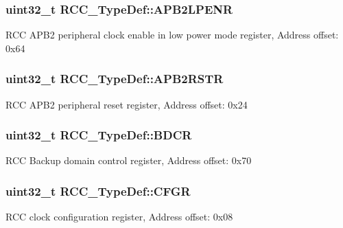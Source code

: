 \subsubsection[{\texorpdfstring{A\+P\+B2\+L\+P\+E\+NR}{APB2LPENR}}]{ uint32\+\_\+t R\+C\+C\+\_\+\+Type\+Def\+::\+A\+P\+B2\+L\+P\+E\+NR}\hypertarget{struct_r_c_c___type_def_a7e46c65220f00a6858a5b35b74a37b51}{}\label{struct_r_c_c___type_def_a7e46c65220f00a6858a5b35b74a37b51}
R\+CC A\+P\+B2 peripheral clock enable in low power mode register, Address offset\+: 0x64 
\subsubsection[{\texorpdfstring{A\+P\+B2\+R\+S\+TR}{APB2RSTR}}]{ uint32\+\_\+t R\+C\+C\+\_\+\+Type\+Def\+::\+A\+P\+B2\+R\+S\+TR}\hypertarget{struct_r_c_c___type_def_a4491ab20a44b70bf7abd247791676a59}{}\label{struct_r_c_c___type_def_a4491ab20a44b70bf7abd247791676a59}
R\+CC A\+P\+B2 peripheral reset register, Address offset\+: 0x24 
\subsubsection[{\texorpdfstring{B\+D\+CR}{BDCR}}]{ uint32\+\_\+t R\+C\+C\+\_\+\+Type\+Def\+::\+B\+D\+CR}\hypertarget{struct_r_c_c___type_def_a05be375db50e8c9dd24fb3bcf42d7cf1}{}\label{struct_r_c_c___type_def_a05be375db50e8c9dd24fb3bcf42d7cf1}
R\+CC Backup domain control register, Address offset\+: 0x70 
\subsubsection[{\texorpdfstring{C\+F\+GR}{CFGR}}]{ uint32\+\_\+t R\+C\+C\+\_\+\+Type\+Def\+::\+C\+F\+GR}\hypertarget{struct_r_c_c___type_def_a0721b1b729c313211126709559fad371}{}\label{struct_r_c_c___type_def_a0721b1b729c313211126709559fad371}
R\+CC clock configuration register, Address offset\+: 0x08 
